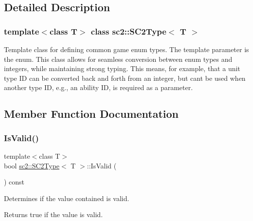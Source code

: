 \subsection{Detailed Description}
\subsubsection*{template$<$class T$>$\newline
class sc2\+::\+S\+C2\+Type$<$ T $>$}

Template class for defining common game enum types. The template parameter is the enum. This class allows for seamless conversion between enum types and integers, while maintaining strong typing. This means, for example, that a unit type ID can be converted back and forth from an integer, but can\textquotesingle{}t be used when another type ID, e.\+g., an ability ID, is required as a parameter. 

\subsection{Member Function Documentation}
\mbox{\label{classsc2_1_1_s_c2_type_a359fd3f5911b611089dac072f2ba528f}} 
\subsubsection{\texorpdfstring{Is\+Valid()}{IsValid()}}
{\footnotesize\ttfamily template$<$class T$>$ \\
bool \hyperlink{classsc2_1_1_s_c2_type}{sc2\+::\+S\+C2\+Type}$<$ T $>$\+::Is\+Valid (\begin{DoxyParamCaption}{ }\end{DoxyParamCaption}) const\hspace{0.3cm}{\ttfamily [inline]}}

Determines if the value contained is valid. \begin{DoxyReturn}{Returns}
\textquotesingle{}true\textquotesingle{} if the value is valid. 
\end{DoxyReturn}
\mbox{\label{classsc2_1_1_s_c2_type_a6e032550a699843364b52d9f30d7ddcc}} 
